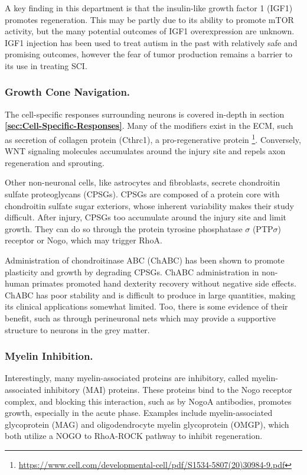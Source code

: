 A key finding in this department is that the insulin-like growth factor 1 (IGF1) promotes regeneration. This may be partly due to its ability to promote mTOR activity, but the many potential outcomes of IGF1 overexpression are unknown. IGF1 injection has been used to treat autism in the past with relatively safe and promising outcomes, however the fear of tumor production remains a barrier to its use in treating SCI.

\subsubsection{Growth Cone Navigation.}

The cell-specific responses surrounding neurons is covered in-depth in section \textbf{\ref{sec:Cell-Specific-Responses}}. Many of the modifiers exist in the ECM, such as secretion of collagen protein (Cthrc1), a pro-regenerative protein \footnote{\url{https://www.cell.com/developmental-cell/pdf/S1534-5807(20)30984-9.pdf}}. Conversely, WNT signaling molecules accumulates around the injury site and repels axon regeneration and sprouting.\newline 

Other non-neuronal cells, like astrocytes and fibroblasts, secrete chondroitin sulfate proteoglycans (CPSGs). CPSGs are composed of a protein core with chondroitin sulfate sugar exteriors, whose inherent variability makes their study difficult. After injury, CPSGs too accumulate around the injury site and limit growth.  They can do so through the protein tyrosine phosphatase $\sigma$ (PTP$\sigma$) receptor or Nogo, which may trigger RhoA.  \newline

Administration of chondroitinase ABC (ChABC) has been shown to promote plasticity and growth by degrading CPSGs. ChABC administration in non-human primates promoted hand dexterity recovery without negative side effects. ChABC has poor stability and is difficult to produce in large quantities, making its clinical applications somewhat limited. Too, there is some evidence of their benefit, such as through perineuronal nets which may provide a supportive structure to neurons in the grey matter.\newline  


\subsubsection{Myelin Inhibition.}

Interestingly, many myelin-associated proteins are inhibitory, called myelin-associated inhibitory (MAI) proteins. These proteins bind to the Nogo receptor complex, and blocking this interaction, such as by NogoA antibodies, promotes growth, especially in the acute phase. Examples include myelin-associated glycoprotein (MAG) and oligodendrocyte myelin glycoprotein (OMGP), which both utilize a NOGO to RhoA-ROCK pathway to inhibit regeneration. 

